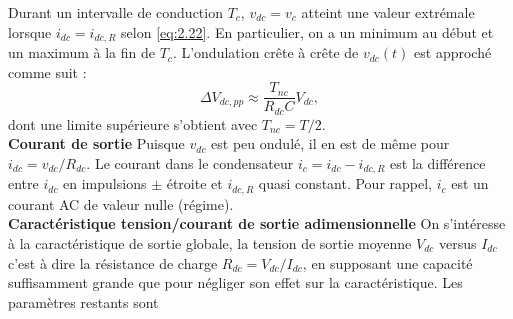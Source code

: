 			Durant un intervalle de conduction $T_c$, $v_{dc} = v_c$ atteint une valeur extrémale lorsque $i_{dc} = i_{dc,R}$ selon \eqref{eq:2.22}. En particulier, on a un minimum au début et un maximum à la fin de $T_c$. L'ondulation crête à crête de $v_{dc}(t)$ est approché comme suit :
			\begin{equation}
				\Delta V_{dc,pp} \approx \frac{T_{nc}}{R_{dc}C}V_{dc},
			\end{equation}
			dont une limite supérieure s'obtient avec $T_{nc} = T/2$.
			\\
			
			\textbf{Courant de sortie} \qquad Puisque $v_{dc}$ est peu ondulé, il en est de même pour $i_{dc} = v_{dc}/R_{dc}$. Le courant dans le condensateur $i_c = i_{dc}-i_{dc,R}$ est la différence entre $i_{dc}$ en impulsions $\pm$ étroite et $i_{dc,R}$ quasi constant. Pour rappel, $i_c$ est un courant AC de valeur nulle (régime). 
			\\
			
			\textbf{Caractéristique tension/courant de sortie adimensionnelle} \qquad On s'intéresse à la caractéristique de sortie globale, la tension de sortie moyenne $V_{dc}$ versus $I_{dc}$ c'est à dire la résistance de charge $R_{dc}=V_{dc}/I_{dc}$, en supposant une capacité suffisamment grande que pour négliger son effet sur la caractéristique. Les paramètres restants sont 

